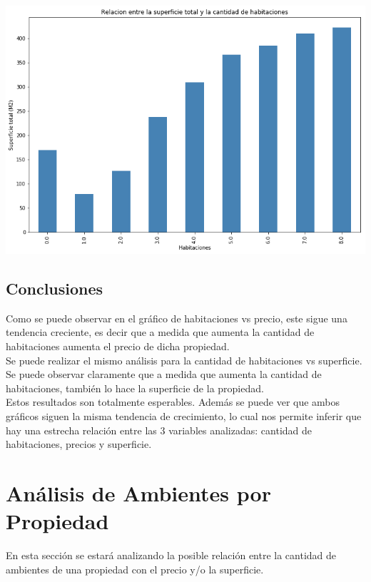 \documentclass[a4paper, 10pt]{article}
\begin{document}
				\begin{center}    		
    				\includegraphics[width=\textwidth]{images/RelHabSup}    				
				\end{center}
			
			\subsection{Conclusiones}
				
				Como se puede observar en el gráfico de habitaciones vs precio, este sigue una tendencia creciente, es decir que a medida que aumenta la cantidad de habitaciones aumenta el precio de dicha propiedad.
				\\
				Se puede realizar el mismo análisis para la cantidad de habitaciones vs superficie. Se puede observar claramente que a medida que aumenta la cantidad de habitaciones, también lo hace la superficie de la propiedad. 
				\\
				Estos resultados son totalmente esperables. Además se puede ver que ambos gráficos siguen la misma tendencia de crecimiento, lo cual nos permite inferir que hay una estrecha relación entre las 3 variables analizadas: cantidad de habitaciones, precios y superficie.  
							
		
		\section{Análisis de Ambientes por Propiedad}
				
			En esta sección se estará analizando la posible relación entre la cantidad de ambientes de una propiedad con el precio y/o la superficie.			
				
\end{document}
